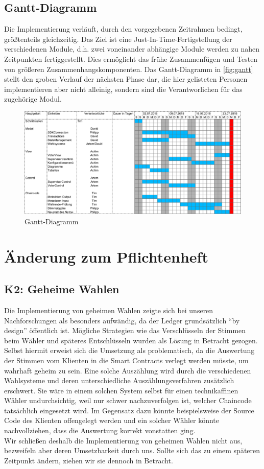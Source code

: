 \documentclass[parskip=full]{scrartcl}
\begin{document}
	\subsection{Gantt-Diagramm}
	Die Implementierung verläuft, durch den vorgegebenen Zeitrahmen bedingt, größtenteils gleichzeitig. Das Ziel ist eine Just-In-Time-Fertigstellung der verschiedenen Module, d.h. zwei voneinander abhängige Module werden zu nahen Zeitpunkten fertiggestellt. Dies ermöglicht das frühe Zusammenfügen und Testen von größeren Zusammenhangskomponenten. Das Gantt-Diagramm in \autoref{fig:gantt} stellt den groben Verlauf der nächsten Phase dar, die hier gelisteten Personen implementieren aber nicht alleinig, sondern sind die Verantworlichen für das zugehörige Modul.
	\begin{figure}[!h]
		\centering
		\includegraphics[width=\textwidth]{pictures/Gantt.pdf}
		\caption{Gantt-Diagramm}
		\label{fig:gantt}
	\end{figure}
	\section{Änderung zum Pflichtenheft}
	\subsection{K2: Geheime Wahlen}
	Die Implementierung von geheimen Wahlen zeigte sich bei unseren Nachforschungen als besonders aufwändig, da der Ledger grundsätzlich \enquote{by design} öffentlich ist. Mögliche Strategien wie das Verschlüsseln der Stimmen beim Wähler und späteres Entschlüsseln wurden als Lösung in Betracht gezogen. Selbst hiermit erweist sich die Umsetzung als problematisch, da die Auswertung der Stimmen vom Klienten in die Smart Contracts verlegt werden müsste, um wahrhaft geheim zu sein. Eine solche Auszählung wird durch die verschiedenen Wahlsysteme und deren unterschiedliche Auszählungsverfahren zusätzlich erschwert. Sie wäre in einem solchen System selbst für einen technikaffinen Wähler undurchsichtig, weil nur schwer nachzuverfolgen ist, welcher Chaincode tatsächlich eingesetzt wird. Im Gegensatz dazu könnte beispielsweise der Source Code des Klienten offengelegt werden und ein solcher Wähler könnte nachvollziehen, dass die Auswertung korrekt vonstatten ging. \\ Wir schließen deshalb die Implementierung von geheimen Wahlen nicht aus, bezweifeln aber deren Umsetzbarkeit durch uns. Sollte sich das zu einem späteren Zeitpunkt ändern, ziehen wir sie dennoch in Betracht.
\end{document}
